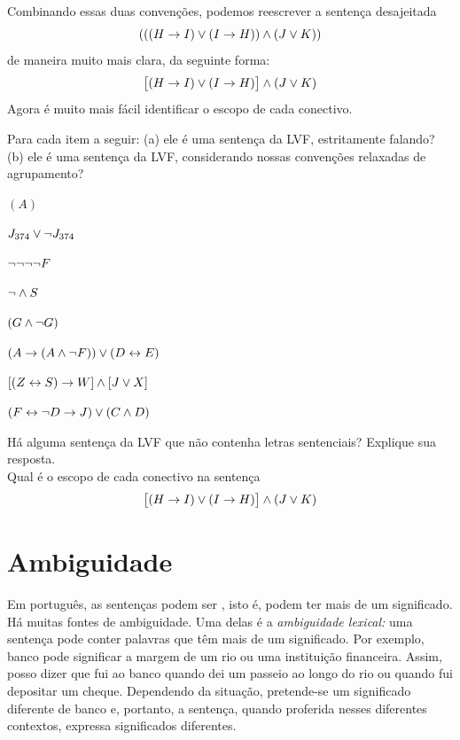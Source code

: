 Combinando essas duas convenções, podemos reescrever a sentença
desajeitada
$$(((H \rightarrow I) \vee (I \rightarrow H)) \wedge (J \vee K))$$
de maneira muito mais clara, da seguinte forma:
$$\bigl[(H \rightarrow I) \vee (I \rightarrow H)\bigr] \wedge (J \vee K)$$
Agora é muito mais fácil identificar o escopo de cada conectivo.

\practiceproblems

\solutions
\problempart
\label{pr.wiffTFL}
Para cada item a seguir: (a) ele é uma sentença da LVF, estritamente
falando? (b) ele é uma sentença da LVF, considerando nossas convenções
relaxadas de agrupamento?
\begin{compactlist}
\item $(A)$
\item $J_{374} \vee \neg J_{374}$
\item $\neg \neg \neg \neg F$
\item $\neg \wedge S$
\item $(G \wedge \neg G)$
\item $(A \rightarrow (A \wedge \neg F)) \vee (D \leftrightarrow E)$
\item $[(Z \leftrightarrow S) \rightarrow W] \wedge [J \vee X]$
\item $(F \leftrightarrow \neg D \rightarrow J) \vee (C \wedge D)$
\end{compactlist}

\problempart
Há alguma sentença da LVF que não contenha letras sentenciais? Explique sua resposta.\\

\problempart
Qual é o escopo de cada conectivo na sentença
$$\bigl[(H \rightarrow I) \vee (I \rightarrow H)\bigr] \wedge (J \vee K)$$

\chapter{Ambiguidade}\label{s:AmbiguityTFL}

Em português, as sentenças podem ser , isto é, podem
ter mais de um significado. Há muitas fontes de ambiguidade. Uma delas é
a \emph{ambiguidade lexical:} uma sentença pode conter palavras que têm
mais de um significado. Por exemplo, banco pode significar a
margem de um rio ou uma instituição financeira. Assim, posso dizer que
fui ao banco quando dei um passeio ao longo do rio ou quando fui
depositar um cheque. Dependendo da situação, pretende-se um significado
diferente de banco e, portanto, a sentença, quando proferida
nesses diferentes contextos, expressa significados diferentes.


